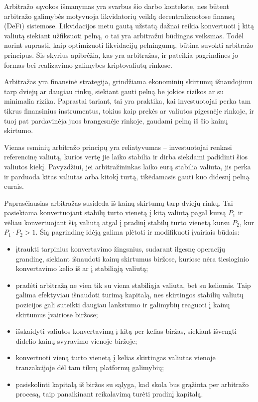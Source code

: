 \documentclass[]{VUMIFTemplateClass}
\begin{document}
Arbitražo sąvokos išmanymas yra svarbus šio darbo kontekste, nes būtent arbitražo galimybės motyvuoja likvidatorių veiklą decentralizuotose finansų (DeFi) sistemose. Likvidacijos metu gautą užstatą dažnai reikia konvertuoti į kitą valiutą siekiant užfiksuoti pelną, o tai yra arbitražui būdingas veiksmas. Todėl norint suprasti, kaip optimizuoti likvidacijų pelningumą, būtina suvokti arbitražo principus. Šis skyrius apibrėžia, kas yra arbitražas, ir pateikia pagrindines jo formas bei realizavimo galimybes kriptovaliutų rinkose.

Arbitražas yra finansinė strategija, grindžiama ekonominių skirtumų išnaudojimu tarp dviejų ar daugiau rinkų, siekiant gauti pelną be jokios rizikos ar su minimalia rizika. Paprastai tariant, tai yra praktika, kai investuotojai perka tam tikrus finansinius instrumentus, tokius kaip prekės ar valiutos pigesnėje rinkoje, ir tuoj pat pardavinėja juos brangesnėje rinkoje, gaudami pelną iš šio kainų skirtumo.

Vienas esminių arbitražo principų yra reliatyvumas -- investuotojai renkasi referencinę valiutą, kurios vertę jie laiko stabilia ir dirba siekdami padidinti šios valiutos kiekį. Pavyzdžiui, jei arbitražininkas laiko eurą stabilia valiuta, jis perka ir parduoda kitas valiutas arba kitokį turtą, tikėdamasis gauti kuo didesnį pelną eurais.

Paprasčiausias arbitražas susideda iš kainų skirtumų tarp dviejų rinkų. Tai pasiekiama konvertuojant stabilų turto vienetą į kitą valiutą pagal kursą $P_1$ ir vėliau konvertuojant šią valiutą atgal į pradinį stabilų turto vienetą kursu $P_2$, kur $P_1 \cdot P_2 > 1$. Šią pagrindinę idėją galima plėtoti ir modifikuoti įvairiais būdais:

\begin{itemize}
    \item įtraukti tarpinius konvertavimo žingsnius, sudarant ilgesnę operacijų grandinę, siekiant išnaudoti kainų skirtumus biržose, kuriose nėra tiesioginio konvertavimo kelio iš ar į stabiliąją valiutą;
    \item pradėti arbitražą ne vien tik su viena stabiliąja valiuta, bet su keliomis. Taip galima efektyviau išnaudoti turimą kapitalą, nes skirtingos stabilių valiutų pozicijos gali suteikti daugiau lankstumo ir galimybių reaguoti į kainų skirtumus įvairiose biržose;
    \item išskaidyti valiutos konvertavimą į kitą per kelias biržas, siekiant išvengti didelio kainų svyravimo vienoje biržoje;
    \item konvertuoti vieną turto vienetą į kelias skirtingas valiutas vienoje tranzakcijoje dėl tam tikrų platformų galimybių;
    \item pasiskolinti kapitalą iš biržos su sąlyga, kad skola bus grąžinta per arbitražo procesą, taip panaikinant reikalavimą turėti pradinį kapitalą.
\end{itemize}
\end{document}
